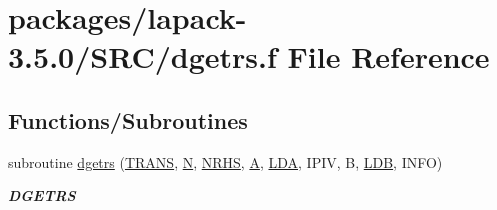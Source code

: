 \hypertarget{dgetrs_8f}{}\section{packages/lapack-\/3.5.0/\+S\+R\+C/dgetrs.f File Reference}
\label{dgetrs_8f}
\subsection*{Functions/\+Subroutines}
\begin{DoxyCompactItemize}
\item 
subroutine \hyperlink{group__doubleGEcomputational_ga58e332cb1b8ab770270843221a48296d}{dgetrs} (\hyperlink{superlu__enum__consts_8h_a0c4e17b2d5cea33f9991ccc6a6678d62a1f61e3015bfe0f0c2c3fda4c5a0cdf58}{T\+R\+A\+N\+S}, \hyperlink{polmisc_8c_a0240ac851181b84ac374872dc5434ee4}{N}, \hyperlink{example__user_8c_aa0138da002ce2a90360df2f521eb3198}{N\+R\+H\+S}, \hyperlink{classA}{A}, \hyperlink{example__user_8c_ae946da542ce0db94dced19b2ecefd1aa}{L\+D\+A}, I\+P\+I\+V, B, \hyperlink{example__user_8c_a50e90a7104df172b5a89a06c47fcca04}{L\+D\+B}, I\+N\+F\+O)
\begin{DoxyCompactList}\small\item\em {\bfseries D\+G\+E\+T\+R\+S} \end{DoxyCompactList}\end{DoxyCompactItemize}

